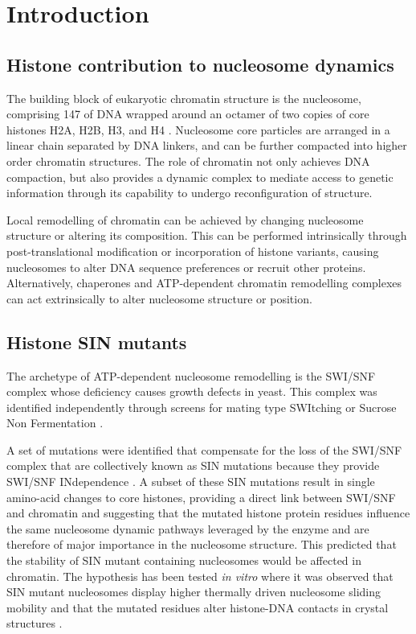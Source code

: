 \section{Introduction}

  \subsection{Histone contribution to nucleosome dynamics}

    The building block of eukaryotic chromatin structure is the nucleosome, comprising
    \SI{147}{\bp} of DNA wrapped around an octamer of two copies of core histones H2A,
    H2B, H3, and H4 \citep{luger1997crystal}.
    Nucleosome core particles are arranged in a linear chain separated by DNA linkers, and
    can be further compacted into higher order chromatin structures.
    The role of chromatin not only achieves DNA compaction,
    but also provides a dynamic complex to mediate access to genetic
    information through its capability to undergo reconfiguration of structure. 

    Local remodelling of chromatin can be achieved
    by changing nucleosome structure or altering its composition.
    This can be performed intrinsically through post-translational modification
    or incorporation of histone variants,
    causing nucleosomes to alter DNA sequence preferences or recruit other proteins.
    Alternatively, chaperones and ATP-dependent chromatin remodelling complexes
    can act extrinsically to alter nucleosome structure or position.

  \subsection{Histone SIN mutants}

    The archetype of ATP-dependent nucleosome remodelling is the SWI/SNF complex
    whose deficiency causes growth defects in yeast.
    This complex was identified independently through screens for
    mating type SWItching \citep{SWI-mutants}
    or Sucrose Non Fermentation \citep{SNF-mutants-original-discovery, SNF-mutants2}.

    A set of mutations were identified that compensate
    for the loss of the SWI/SNF complex
    that are collectively known as SIN mutations because they
    provide SWI/SNF INdependence  .
    A subset of these SIN mutations result in single amino-acid changes to core histones,
    providing a direct link between SWI/SNF and chromatin and suggesting
    that the mutated histone protein residues influence the same 
    nucleosome dynamic pathways leveraged by the enzyme and are therefore
    of major importance in the nucleosome structure.
    This predicted that the stability of SIN mutant containing nucleosomes would be affected in chromatin.
    The hypothesis has been tested \textit{in vitro}
    where it was observed that SIN mutant nucleosomes display higher 
    thermally driven nucleosome sliding mobility \citep{flaus2004sin}
    and that the mutated residues alter histone-DNA contacts in crystal structures .

